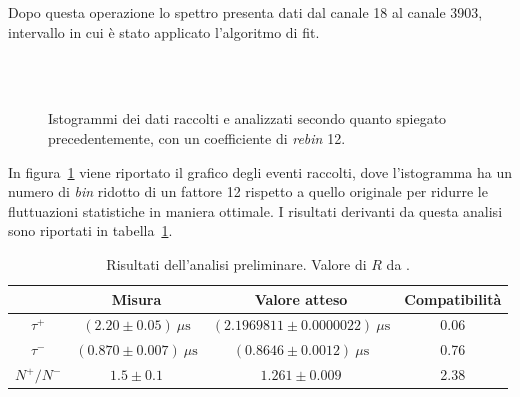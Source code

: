 \documentclass[10pt, oneside, a4paper]{article}   	%
\begin{document}
Dopo questa operazione lo spettro presenta dati dal canale 18 al canale 3903, intervallo in cui è stato applicato l'algoritmo di fit. 

%
\begin{figure}[h!]
\centering
{} \\
 \\
\caption{Istogrammi dei dati raccolti e analizzati secondo quanto spiegato precedentemente, con un coefficiente di \emph{rebin} 12.}
\label{fig::histo}
\end{figure}
%
In figura~\ref{fig::histo} viene riportato il grafico degli eventi raccolti, dove l'istogramma ha un numero di \emph{bin} ridotto di un fattore 12 rispetto a quello originale per ridurre le fluttuazioni statistiche in maniera ottimale. I risultati derivanti da questa analisi sono riportati in tabella~\ref{results}.
%
\begin{table}[H]
	\centering
	\begin{tabular}{cccc}
		\toprule
				& Misura	& Valore atteso 	& Compatibilità \\	
		\midrule
		$\tau^+$	& $(2.20 \pm 0.05) \ \mu \mbox{s}$ 	& $(2.1969811 \pm 0.0000022) \  \mu \mbox{s}$ 	& 0.06 	\\
		$\tau^-$	& $(0.870 \pm 0.007)  \ \mu \mbox{s}$ 	& $(0.8646 \pm 0.0012)  \ \mu \mbox{s}$ 		& 0.76	\\
		$N^+/N^-$	& $1.5 \pm 0.1$ 	& $1.261 \pm 0.009$ 		& 2.38	\\
		\bottomrule
	\end{tabular}
	\caption{Risultati dell'analisi preliminare. Valore di $R$ da \cite{R}.}
	\label{results}
\end{table}
\end{document}
